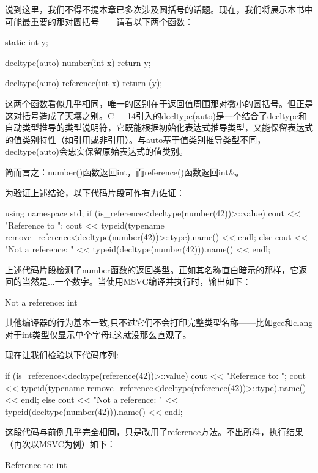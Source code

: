 
说到这里，我们不得不提本章已多次涉及圆括号的话题。现在，我们将展示本书中可能最重要的那对圆括号——请看以下两个函数：

\begin{cpp}
static int y;

decltype(auto) number(int x) {
  return y;
}

decltype(auto) reference(int x) {
  return (y);
}
\end{cpp}

这两个函数看似几乎相同，唯一的区别在于返回值周围那对微小的圆括号。但正是这对括号造成了天壤之别。C++14引入的decltype(auto)是一个结合了decltype和自动类型推导的类型说明符，它既能根据初始化表达式推导类型，又能保留表达式的值类别特性（如引用或非引用）。与auto基于值类别推导类型不同，decltype(auto)会忠实保留原始表达式的值类别。

简而言之：number()函数返回int，而reference()函数返回int\&。

为验证上述结论，以下代码片段可作有力佐证：

\begin{cpp}
using namespace std;
if (is_reference<decltype(number(42))>::value) {
  cout << "Reference to ";
  cout << typeid(typename
  remove_reference<decltype(number(42))>::type).name() << endl;
} else {
  cout << "Not a reference: " << typeid(decltype(number(42))).name() << endl;
}
\end{cpp}

上述代码片段检测了number函数的返回类型。正如其名称直白暗示的那样，它返回的当然是...一个数字。当使用MSVC编译并执行时，输出如下：

\begin{shell}
Not a reference: int
\end{shell}

其他编译器的行为基本一致,只不过它们不会打印完整类型名称——比如gcc和clang对于int类型仅显示单个字母i,这就没那么直观了。

现在让我们检验以下代码序列:

\begin{cpp}
if (is_reference<decltype(reference(42))>::value) {
  cout << "Reference to: ";
  cout << typeid(typename
  remove_reference<decltype(reference(42))>::type).name() << endl;
} else {
  cout << "Not a reference: " << typeid(decltype(number(42))).name() << endl;
}
\end{cpp}

这段代码与前例几乎完全相同，只是改用了reference方法。不出所料，执行结果（再次以MSVC为例）如下：

\begin{shell}
Reference to: int
\end{shell}

